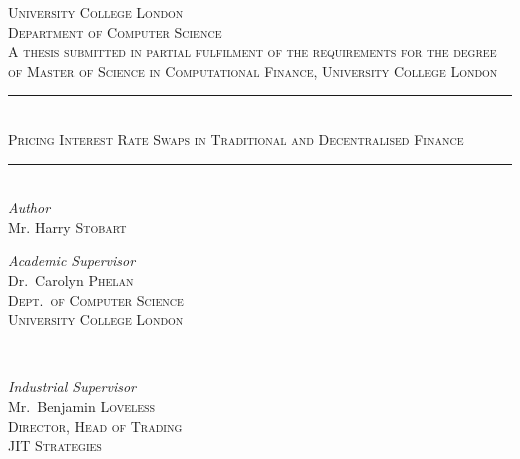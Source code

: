 \begin{titlepage} %
	\newcommand{\HRule}{\rule{\linewidth}{0.5mm}} %
	
	\center %
	\textsc{\LARGE University College London}\\[1.5cm] %
	
	\textsc{\Large Department of Computer Science}\\[0.5cm] %
	
	\textsc{\large A thesis submitted in partial fulfilment of the requirements for the degree of Master of Science in Computational Finance, University College London}\\[0.5cm] %
	\HRule\\[0.4cm]
	\textsc{\huge Pricing Interest Rate Swaps in Traditional and Decentralised Finance}\\%
	\HRule\\[1.5cm]
	{\large\textit{Author}}\\
	Mr. Harry \textsc{Stobart} %
	\vfill
	\begin{minipage}{0.48\textwidth}
		\begin{flushleft}
			\large
			\textit{Academic Supervisor}\\
			Dr.\ Carolyn \textsc{Phelan}\\ %
			\textsc{Dept.\ of Computer Science}\\
			\textsc{University College London}
		\end{flushleft}
	\end{minipage}
	~%
	\begin{minipage}{0.48\textwidth}
		\begin{flushright}
			\large
			\textit{Industrial Supervisor}\\
			Mr.\ Benjamin \textsc{Loveless}\\ %
			\textsc{Director, Head of Trading}\\%
			\textsc{JIT Strategies}%
		\end{flushright}
	\end{minipage}
	\vfill\vfill\vfill %
	

\end{titlepage}
